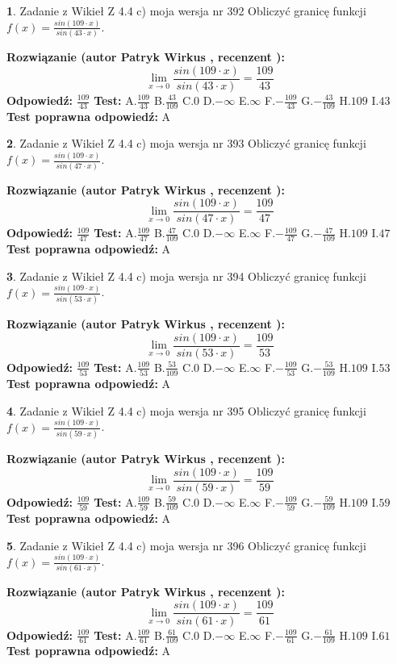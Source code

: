 \documentclass[12pt, a4paper]{article}
\theoremstyle{definition} %
\newtheorem{zad}{}
\newcommand{\zadStart}[1]{\begin{zad}#1\newline}
\newcommand{\zadStop}{\end{zad}}
\newcommand{\rozwStart}[2]{\noindent \textbf{Rozwiązanie (autor #1 , recenzent #2): }\newline}
\newcommand{\rozwStop}{\newline}
\newcommand{\odpStart}{\noindent \textbf{Odpowiedź:}\newline}
\newcommand{\odpStop}{\newline}
\newcommand{\testStart}{\noindent \textbf{Test:}\newline}
\newcommand{\testStop}{\newline}
\newcommand{\kluczStart}{\noindent \textbf{Test poprawna odpowiedź:}\newline}
\newcommand{\kluczStop}{\newline}
\begin{document}
\zadStart{Zadanie z Wikieł Z 4.4 c) moja wersja nr 392}
Obliczyć granicę funkcji $f(x)=\frac{sin(109\cdot x)}{sin(43\cdot x)}$.
\zadStop
\rozwStart{Patryk Wirkus}{}
$$\lim\limits_{x\to 0}\frac{sin(109\cdot x)}{sin(43\cdot x)}=
\frac{109}{43}$$
\rozwStop
\odpStart
$\frac{109}{43}$
\odpStop
\testStart
A.$\frac{109}{43}$
B.$\frac{43}{109}$
C.$0$
D.$-\infty$
E.$\infty$
F.$-\frac{109}{43}$
G.$-\frac{43}{109}$
H.$109$
I.$43$
\testStop
\kluczStart
A
\kluczStop



\zadStart{Zadanie z Wikieł Z 4.4 c) moja wersja nr 393}
Obliczyć granicę funkcji $f(x)=\frac{sin(109\cdot x)}{sin(47\cdot x)}$.
\zadStop
\rozwStart{Patryk Wirkus}{}
$$\lim\limits_{x\to 0}\frac{sin(109\cdot x)}{sin(47\cdot x)}=
\frac{109}{47}$$
\rozwStop
\odpStart
$\frac{109}{47}$
\odpStop
\testStart
A.$\frac{109}{47}$
B.$\frac{47}{109}$
C.$0$
D.$-\infty$
E.$\infty$
F.$-\frac{109}{47}$
G.$-\frac{47}{109}$
H.$109$
I.$47$
\testStop
\kluczStart
A
\kluczStop



\zadStart{Zadanie z Wikieł Z 4.4 c) moja wersja nr 394}
Obliczyć granicę funkcji $f(x)=\frac{sin(109\cdot x)}{sin(53\cdot x)}$.
\zadStop
\rozwStart{Patryk Wirkus}{}
$$\lim\limits_{x\to 0}\frac{sin(109\cdot x)}{sin(53\cdot x)}=
\frac{109}{53}$$
\rozwStop
\odpStart
$\frac{109}{53}$
\odpStop
\testStart
A.$\frac{109}{53}$
B.$\frac{53}{109}$
C.$0$
D.$-\infty$
E.$\infty$
F.$-\frac{109}{53}$
G.$-\frac{53}{109}$
H.$109$
I.$53$
\testStop
\kluczStart
A
\kluczStop



\zadStart{Zadanie z Wikieł Z 4.4 c) moja wersja nr 395}
Obliczyć granicę funkcji $f(x)=\frac{sin(109\cdot x)}{sin(59\cdot x)}$.
\zadStop
\rozwStart{Patryk Wirkus}{}
$$\lim\limits_{x\to 0}\frac{sin(109\cdot x)}{sin(59\cdot x)}=
\frac{109}{59}$$
\rozwStop
\odpStart
$\frac{109}{59}$
\odpStop
\testStart
A.$\frac{109}{59}$
B.$\frac{59}{109}$
C.$0$
D.$-\infty$
E.$\infty$
F.$-\frac{109}{59}$
G.$-\frac{59}{109}$
H.$109$
I.$59$
\testStop
\kluczStart
A
\kluczStop



\zadStart{Zadanie z Wikieł Z 4.4 c) moja wersja nr 396}
Obliczyć granicę funkcji $f(x)=\frac{sin(109\cdot x)}{sin(61\cdot x)}$.
\zadStop
\rozwStart{Patryk Wirkus}{}
$$\lim\limits_{x\to 0}\frac{sin(109\cdot x)}{sin(61\cdot x)}=
\frac{109}{61}$$
\rozwStop
\odpStart
$\frac{109}{61}$
\odpStop
\testStart
A.$\frac{109}{61}$
B.$\frac{61}{109}$
C.$0$
D.$-\infty$
E.$\infty$
F.$-\frac{109}{61}$
G.$-\frac{61}{109}$
H.$109$
I.$61$
\testStop
\kluczStart
A
\kluczStop
\end{document}
